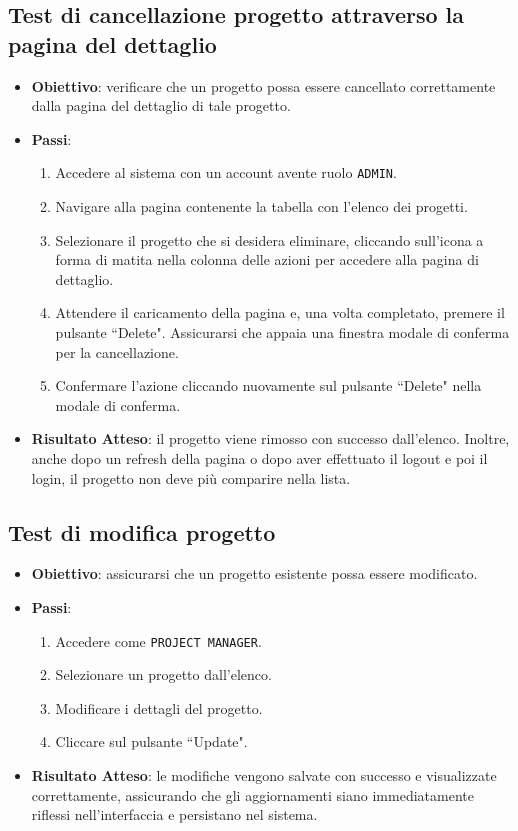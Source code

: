 \documentclass[target=bach,aauheader=,style=]{thud}
\begin{document}
\subsection{Test di cancellazione progetto attraverso la pagina del dettaglio}
\begin{itemize}
    \item \textbf{Obiettivo}: verificare che un progetto possa essere cancellato correttamente dalla pagina del dettaglio di tale progetto.
    \item \textbf{Passi}:
    \begin{enumerate}
        \item Accedere al sistema con un account avente ruolo \texttt{ADMIN}.
        \item Navigare alla pagina contenente la tabella con l'elenco dei progetti.
        \item Selezionare il progetto che si desidera eliminare, cliccando sull'icona a forma di matita nella colonna delle azioni per accedere alla pagina di dettaglio.
        \item Attendere il caricamento della pagina e, una volta completato, premere il pulsante ``Delete". Assicurarsi che appaia una finestra modale di conferma per la cancellazione.
        \item Confermare l'azione cliccando nuovamente sul pulsante ``Delete" nella modale di conferma.
    \end{enumerate}
    \item \textbf{Risultato Atteso}: il progetto viene rimosso con successo dall'elenco. Inoltre, anche dopo un refresh della pagina o dopo aver effettuato il logout e poi il login, il progetto non deve più comparire nella lista.
\end{itemize}


\subsection{Test di modifica progetto}
\begin{itemize}
    \item \textbf{Obiettivo}: assicurarsi che un progetto esistente possa essere modificato.
    \item \textbf{Passi}:
    \begin{enumerate}
        \item Accedere come \texttt{PROJECT MANAGER}.
        \item Selezionare un progetto dall'elenco.
        \item Modificare i dettagli del progetto.
        \item Cliccare sul pulsante ``Update".
    \end{enumerate}
    \item \textbf{Risultato Atteso}: le modifiche vengono salvate con successo e visualizzate correttamente, assicurando che gli aggiornamenti siano immediatamente riflessi nell'interfaccia e persistano nel sistema.
\end{itemize}
\end{document}
